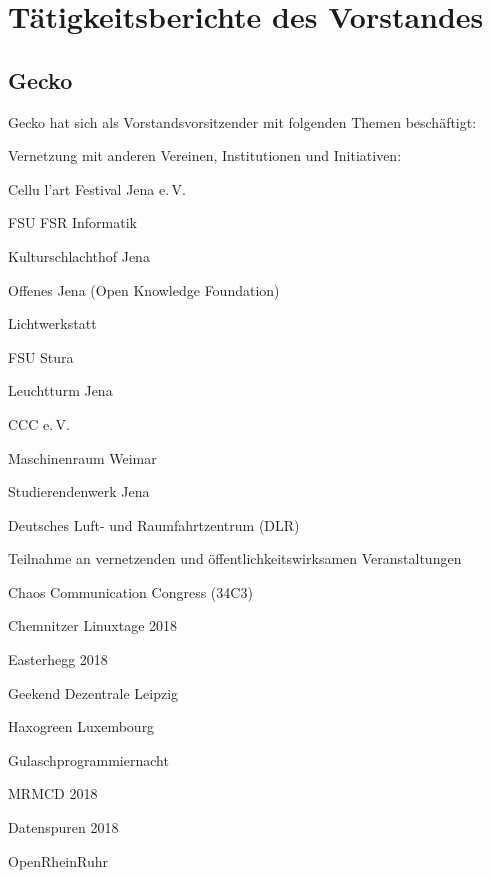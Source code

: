 \documentclass[ngerman]{scrartcl}
\begin{document}
\section{Tätigkeitsberichte des Vorstandes}

\subsection{Gecko}

Gecko hat sich als Vorstandsvorsitzender mit folgenden Themen beschäftigt:

\begin{compactitem}
    \item Vernetzung mit anderen Vereinen, Institutionen und Initiativen:
    \begin{compactitem}
        \item Cellu l'art Festival Jena e.\,V. 
        \item FSU FSR Informatik
        \item Kulturschlachthof Jena
        \item Offenes Jena (Open Knowledge Foundation)
        \item Lichtwerkstatt
        \item FSU Stura
        \item Leuchtturm Jena
        \item CCC e.\,V.
        \item Maschinenraum Weimar
        \item Studierendenwerk Jena
        \item Deutsches Luft- und Raumfahrtzentrum (DLR)
    \end{compactitem}
    \item Teilnahme an vernetzenden und öffentlichkeitswirksamen Veranstaltungen
    \begin{compactitem}
        \item Chaos Communication Congress (34C3)
        \item Chemnitzer Linuxtage 2018
        \item Easterhegg 2018
        \item Geekend Dezentrale Leipzig
        \item Haxogreen Luxembourg
        \item Gulaschprogrammiernacht
        \item MRMCD 2018
        \item Datenspuren 2018
        \item OpenRheinRuhr
    \end{compactitem}

\end{compactitem}
\end{document}
